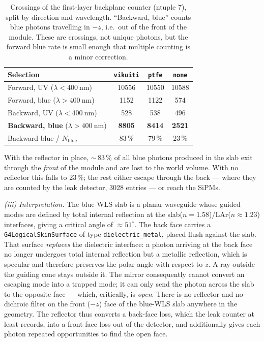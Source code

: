 \documentclass[a4paper,11pt]{article}
\begin{document}
\begin{table}[htbp]
\centering
\caption{\label{tab:leak}Crossings of the first-layer backplane counter
(ntuple 7), split by direction and wavelength. ``Backward, blue'' counts blue
photons travelling in $-z$, i.e.\ out of the front of the module. These are
crossings, not unique photons, but the forward blue rate is small enough that
multiple counting is a minor correction.}
\begin{tabular}{lccc}
\toprule
Selection & \texttt{vikuiti} & \texttt{ptfe} & \texttt{none} \\
\midrule
Forward,  UV   ($\lambda<\SI{400}{\nano\meter}$) & 10556 & 10550 & 10588 \\
Forward,  blue ($\lambda>\SI{400}{\nano\meter}$) & 1152  & 1122  & 574 \\
Backward, UV   ($\lambda<\SI{400}{\nano\meter}$) & 528   & 538   & 496 \\
\textbf{Backward, blue} ($\lambda>\SI{400}{\nano\meter}$)
                                                 & \textbf{8805} & \textbf{8414} & \textbf{2521} \\
\midrule
Backward blue / $N_{\text{blue}}$                & $83\,\%$ & $79\,\%$ & $23\,\%$ \\
\bottomrule
\end{tabular}
\end{table}

With the reflector in place, $\sim$\,$83\,\%$ of all blue photons produced in
the slab exit through the \emph{front} of the module and are lost to the world
volume. With no reflector this falls to $23\,\%$; the rest either escape through
the back --- where they are counted by the leak detector, 3028 entries --- or
reach the SiPMs.

\emph{(iii) Interpretation.} The blue-WLS slab is a planar waveguide whose
guided modes are defined by total internal reflection at the
slab($n=1.58$)/LAr($n\approx1.23$) interfaces, giving a critical angle of
$\approx51^{\circ}$. The back face carries a \texttt{G4LogicalSkinSurface} of
type \texttt{dielectric\_metal}, placed flush against the slab. That surface
\emph{replaces} the dielectric interface: a photon arriving at the back face no
longer undergoes total internal reflection but a metallic reflection, which is
specular and therefore preserves the polar angle with respect to $z$. A ray
outside the guiding cone stays outside it. The mirror consequently cannot
convert an escaping mode into a trapped mode; it can only send the photon across
the slab to the opposite face --- which, critically, is \emph{open}. There is no
reflector and no dichroic filter on the front ($-z$) face of the blue-WLS slab
anywhere in the geometry. The reflector thus converts a back-face loss, which
the leak counter at least records, into a front-face loss out of the detector,
and additionally gives each photon repeated opportunities to find the open face.
\end{document}
